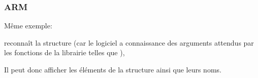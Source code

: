﻿\subsubsection{ARM}

\myparagraph{\OptimizingKeilVI (\ThumbMode)}

Même exemple:



\myparagraph{\OptimizingXcodeIV (\ThumbTwoMode)}

\IDA reconnaît la structure  (car le logiciel a connaissance des arguments attendus par les 
fonctions de la librairie telles que ), 

Il peut donc afficher les éléments de la structure ainsi que leurs noms.


